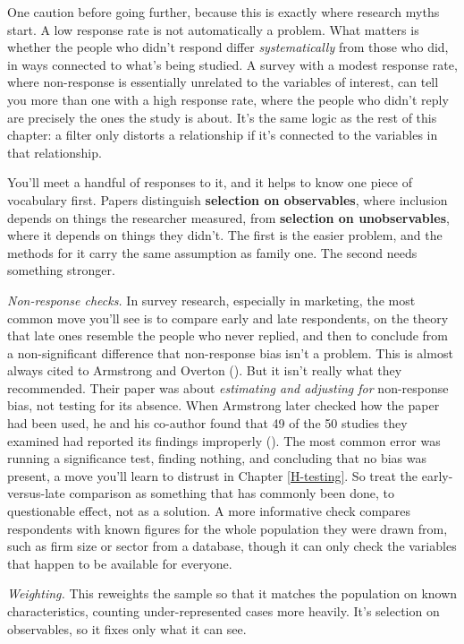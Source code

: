 \documentclass[
]{book}
\begin{document}
One caution before going further, because this is exactly where research myths start. A low response rate is not automatically a problem. What matters is whether the people who didn't respond differ \emph{systematically} from those who did, in ways connected to what's being studied. A survey with a modest response rate, where non-response is essentially unrelated to the variables of interest, can tell you more than one with a high response rate, where the people who didn't reply are precisely the ones the study is about. It's the same logic as the rest of this chapter: a filter only distorts a relationship if it's connected to the variables in that relationship.

You'll meet a handful of responses to it, and it helps to know one piece of vocabulary first. Papers distinguish \textbf{selection on observables}, where inclusion depends on things the researcher measured, from \textbf{selection on unobservables}, where it depends on things they didn't. The first is the easier problem, and the methods for it carry the same assumption as family one. The second needs something stronger.

\emph{Non-response checks.} In survey research, especially in marketing, the most common move you'll see is to compare early and late respondents, on the theory that late ones resemble the people who never replied, and then to conclude from a non-significant difference that non-response bias isn't a problem. This is almost always cited to Armstrong and Overton (). But it isn't really what they recommended. Their paper was about \emph{estimating and adjusting for} non-response bias, not testing for its absence. When Armstrong later checked how the paper had been used, he and his co-author found that 49 of the 50 studies they examined had reported its findings improperly (). The most common error was running a significance test, finding nothing, and concluding that no bias was present, a move you'll learn to distrust in Chapter \ref{H-testing}. So treat the early-versus-late comparison as something that has commonly been done, to questionable effect, not as a solution. A more informative check compares respondents with known figures for the whole population they were drawn from, such as firm size or sector from a database, though it can only check the variables that happen to be available for everyone.

\emph{Weighting.} This reweights the sample so that it matches the population on known characteristics, counting under-represented cases more heavily. It's selection on observables, so it fixes only what it can see.
\end{document}
